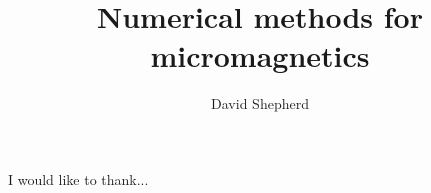 \documentclass[12pt,PhD,a4paper,pdftex,singlespace]{muthesis}
\title{Numerical methods for micromagnetics}
\author{David Shepherd}
\numberwithin{equation}{chapter} %
\begin{document}

\figurespagefalse
\tablespagefalse

\beforeabstract



\afterabstract

I would like to thank...

\afterpreface
















\appendix






\printbibliography
\end{document}
